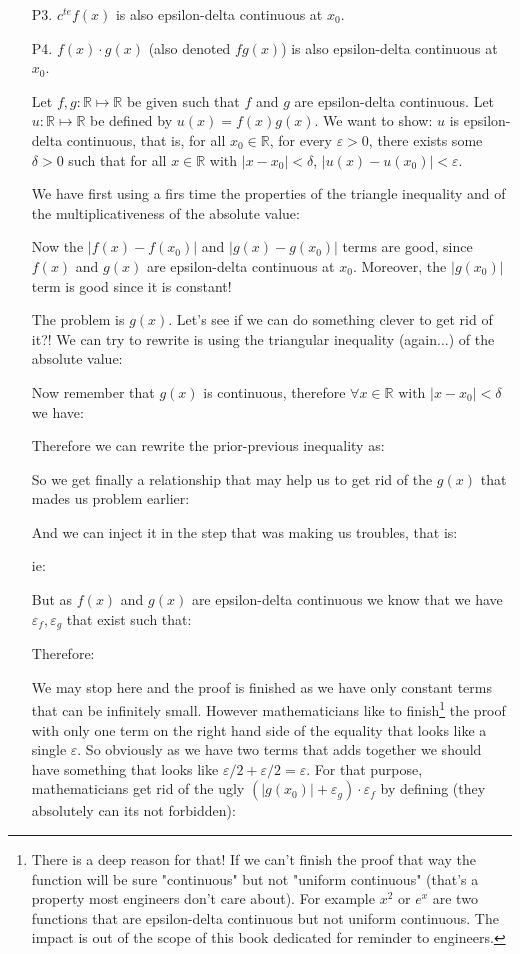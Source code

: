 \begin{enumerate}
		\item[P3.] $c^{te} f(x)$ is also epsilon-delta continuous at $x_0$.
		
		\item[P4.] $f(x)\cdot g(x)$ (also denoted $fg(x)$) is also epsilon-delta continuous at $x_0$.
		
		Let $f, g: \mathbb{R} \mapsto \mathbb{R}$ be given such that $f$ and $g$ are epsilon-delta continuous. Let $u: \mathbb{R} \mapsto \mathbb{R}$ be defined by $u(x)=f(x) g(x)$. We want to show: $u$ is epsilon-delta continuous, that is, for all $x_0 \in \mathbb{R}$, for every $\varepsilon>0$, there exists some $\delta>0$ such that for all $x \in \mathbb{R}$ with $|x-x_0|<\delta$, $|u(x)-u(x_0)|<\varepsilon$.
	
		We have first using a firs time the properties of the triangle inequality and of the  multiplicativeness of the absolute value:
		
		Now the $\left|f(x)-f\left(x_0\right)\right|$ and $\left|g(x)-g\left(x_0\right)\right|$ terms are good, since $f(x)$ and $g(x)$ are  epsilon-delta continuous at $x_0$. Moreover, the $\left|g\left(x_0\right)\right|$ term is good since it is constant!
		
		The problem is $g(x)$. Let's see if we can do something clever to get rid of it?! We can try to rewrite is using the triangular inequality (again...) of the absolute value:
		
		Now remember that $g(x)$ is continuous, therefore $\forall x \in \mathbb{R} \text { with }|x-x_0|<\delta$ we have:
		
		Therefore we can rewrite the prior-previous inequality as:
		
		So we get finally a relationship that may help us to get rid of the $g(x)$ that mades us problem earlier:
		
		And we can inject it in the step that was making us troubles, that is:
		
		ie:
		
		But as $f(x)$ and $g(x)$ are epsilon-delta continuous we know that we have $\varepsilon_f,\varepsilon_g$ that exist such that:
		
		Therefore:
		
		We may stop here and the proof is finished as we have only constant terms that can be infinitely small. However mathematicians like to finish\footnote{There is a deep reason for that! If we can't finish the proof that way the function will be sure "continuous" but not "uniform continuous" (that's a property most engineers don't care about). For example $x^2$ or $e^x$ are two functions that are epsilon-delta continuous but not uniform continuous. The impact is out of the scope of this book dedicated for reminder to engineers.} the proof with only one term on the right hand side of the equality that looks like a single $\varepsilon$. So obviously as we have two terms that adds together we should have something that looks like $\varepsilon/2+\varepsilon/2=\varepsilon$. For that purpose, mathematicians get rid of the ugly $(\left|g\left(x_0\right)\right|+\varepsilon_g)\cdot\varepsilon_f$ by defining (they absolutely can its not forbidden):
		

\end{enumerate}
